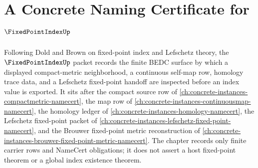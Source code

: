 \chapter{A Concrete Naming Certificate for $\FixedPointIndexUp$}
\label{ch:concrete-instances-fixed-point-index-namecert}

Following Dold and Brown on fixed-point index and Lefschetz theory, the $\FixedPointIndexUp$ packet records the finite BEDC surface by which a displayed compact-metric neighborhood, a continuous self-map row, homology trace data, and a Lefschetz fixed-point handoff are inspected before an index value is exported. It sits after the compact source row of \autoref{ch:concrete-instances-compactmetric-namecert}, the map row of \autoref{ch:concrete-instances-continuousmap-namecert}, the homology ledger of \autoref{ch:concrete-instances-homology-namecert}, the Lefschetz fixed-point packet of \autoref{ch:concrete-instances-lefschetz-fixed-point-namecert}, and the Brouwer fixed-point metric reconstruction of \autoref{ch:concrete-instances-brouwer-fixed-point-metric-namecert}. The chapter records only finite carrier rows and NameCert obligations; it does not assert a host fixed-point theorem or a global index existence theorem.

